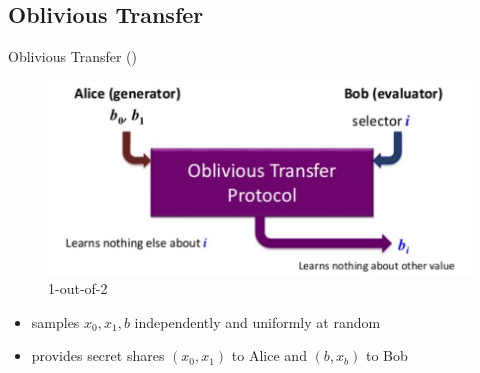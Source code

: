 \subsection{Oblivious Transfer}
\begin{frame}{Oblivious Transfer (\OT)}
	\begin{figure}
		\begin{center}
			\includegraphics[scale = 0.5]{OT-1}
		\end{center}
	\caption{1-out-of-2 \OT}
	\end{figure}
	
	\pause
	
	\begin{definition}
	\begin{itemize}
		\item samples $ x_0, x_1, b  $ independently and uniformly at random 
		\item provides secret shares $ (x_0, x_1) $ to Alice and $ (b, x_b) $ to Bob
	\end{itemize}
	\end{definition}
\end{frame}

